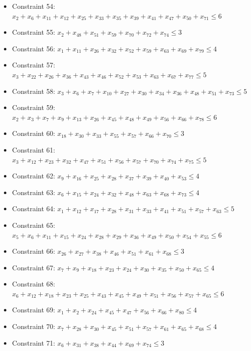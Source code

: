 \documentclass[11pt]{article}
\begin{document}
\begin{itemize}
\item Constraint 54: $x_{2} + x_{6} + x_{11} + x_{12} + x_{25} + x_{33} + x_{35} + x_{39} + x_{41} + x_{47} + x_{50} + x_{71} \le 6$
\item Constraint 55: $x_{2} + x_{48} + x_{51} + x_{59} + x_{70} + x_{72} + x_{74} \le 3$
\item Constraint 56: $x_{1} + x_{11} + x_{26} + x_{32} + x_{52} + x_{59} + x_{63} + x_{69} + x_{79} \le 4$
\item Constraint 57: $x_{3} + x_{22} + x_{26} + x_{36} + x_{43} + x_{46} + x_{52} + x_{53} + x_{63} + x_{67} + x_{77} \le 5$
\item Constraint 58: $x_{3} + x_{6} + x_{7} + x_{10} + x_{27} + x_{30} + x_{34} + x_{36} + x_{48} + x_{51} + x_{73} \le 5$
\item Constraint 59: $x_{2} + x_{3} + x_{7} + x_{9} + x_{13} + x_{26} + x_{45} + x_{48} + x_{49} + x_{56} + x_{66} + x_{78} \le 6$
\item Constraint 60: $x_{18} + x_{30} + x_{33} + x_{55} + x_{57} + x_{66} + x_{70} \le 3$
\item Constraint 61: $x_{3} + x_{12} + x_{23} + x_{32} + x_{47} + x_{51} + x_{56} + x_{57} + x_{70} + x_{74} + x_{75} \le 5$
\item Constraint 62: $x_{9} + x_{16} + x_{25} + x_{28} + x_{37} + x_{39} + x_{40} + x_{53} \le 4$
\item Constraint 63: $x_{6} + x_{15} + x_{24} + x_{32} + x_{48} + x_{63} + x_{68} + x_{73} \le 4$
\item Constraint 64: $x_{1} + x_{12} + x_{17} + x_{28} + x_{31} + x_{33} + x_{41} + x_{51} + x_{57} + x_{63} \le 5$
\item Constraint 65: $x_{5} + x_{6} + x_{11} + x_{15} + x_{24} + x_{28} + x_{29} + x_{36} + x_{49} + x_{50} + x_{54} + x_{55} \le 6$
\item Constraint 66: $x_{26} + x_{27} + x_{38} + x_{46} + x_{51} + x_{61} + x_{68} \le 3$
\item Constraint 67: $x_{7} + x_{9} + x_{18} + x_{23} + x_{24} + x_{30} + x_{35} + x_{50} + x_{65} \le 4$
\item Constraint 68: $x_{6} + x_{12} + x_{18} + x_{23} + x_{25} + x_{43} + x_{45} + x_{49} + x_{51} + x_{56} + x_{57} + x_{65} \le 6$
\item Constraint 69: $x_{1} + x_{2} + x_{24} + x_{45} + x_{47} + x_{56} + x_{66} + x_{80} \le 4$
\item Constraint 70: $x_{7} + x_{28} + x_{30} + x_{45} + x_{51} + x_{57} + x_{61} + x_{65} + x_{68} \le 4$
\item Constraint 71: $x_{6} + x_{31} + x_{38} + x_{44} + x_{69} + x_{74} \le 3$

\end{itemize}
\end{document}
